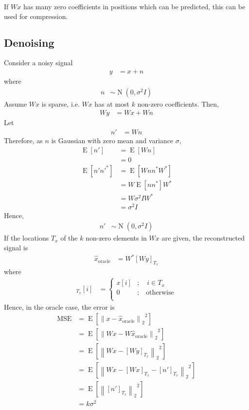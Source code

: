 \documentclass[titlepage, fleqn, a4paper, 12pt, twoside]{article}
\theoremstyle{definition}
\theoremstyle{theorem}
\DeclareMathOperator{\normal}{\mathrm{N}}
\DeclareMathOperator{\expct}{\mathrm{E}}
\begin{document}
If $W x$ has many zero coefficients in positions which can be predicted, this can be used for compression.

\subsection{Denoising}

Consider a noisy signal
\begin{align*}
	y &= x + n
\end{align*}
where
\begin{align*}
	n &\sim \normal\left( 0,\sigma^2 I \right)
\end{align*}
Assume $W x$ is sparse, i.e. $W x$ has at most $k$ non-zero coefficients.
Then,
\begin{align*}
	W y &= W x + W n
\end{align*}
Let
\begin{align*}
	n' &= W n
\end{align*}
Therefore, as $n$ is Gaussian with zero mean and variance $\sigma$,
\begin{align*}
	\expct[n'] &= \expct[W n]\\
	&= 0\\
	\expct\left[ n' {n'}^* \right] &= \expct\left[ W n n^* W^* \right]\\
	&= W \expct\left[ n n^* \right] W^*\\
	&= W \sigma^2 I W^*\\
	&= \sigma^2 I
\end{align*}
Hence,
\begin{align*}
	n' &\sim \normal\left( 0,\sigma^2 I \right)
\end{align*}
If the locations $T_x$ of the $k$ non-zero elements in $W x$ are given, the reconstructed signal is
\begin{align*}
	\hat{x}_{\text{oracle}} &= W^* [W y]_{T_x}
\end{align*}
where
\begin{align*}
	[W y]_{T_x}[i] &=
		\begin{cases}
			x[i] &;\quad i \in T_x\\
			0 &;\quad \text{otherwise}\\
		\end{cases}
\end{align*}
Hence, in the oracle case, the error is
\begin{align*}
	\text{MSE} &= \expct\left[ {\left\| x - \hat{x}_{\text{oracle}} \right\|_2}^2 \right]\\
	&= \expct\left[ {\left\| W x - W \hat{x}_{\text{oracle}} \right\|_2}^2 \right]\\
	&= \expct\left[ {\left\| W x - [W y]_{T_x} \right\|_2}^2 \right]\\
	&= \expct\left[ {\left\| W x - [W x]_{T_x} - [n']_{T_x} \right\|_2}^2 \right]\\
	&= \expct\left[ {\left\| [n']_{T_x} \right\|_2}^2 \right]\\
	&= k \sigma^2
\end{align*}
\end{document}
